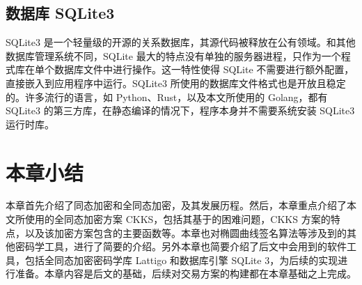 \subsection{数据库 SQLite3}

SQLite3 是一个轻量级的开源的关系数据库，其源代码被释放在公有领域\cite{sqlite3}。和其他数据库管理系统不同，SQLite 最大的特点没有单独的服务器进程，只作为一个程式库在单个数据库文件中进行操作。这一特性使得 SQLite 不需要进行额外配置，直接嵌入到应用程序中运行。SQLite3 所使用的数据库文件格式也是开放且稳定的。许多流行的语言，如 Python、Rust，以及本文所使用的 Golang，都有 SQLite3 的第三方库，在静态编译的情况下，程序本身并不需要系统安装 SQLite3 运行时库。





\section{本章小结}

本章首先介绍了同态加密和全同态加密，及其发展历程。然后，本章重点介绍了本文所使用的全同态加密方案 CKKS，包括其基于的困难问题，CKKS 方案的特点，以及该加密方案包含的主要函数等。本章也对椭圆曲线签名算法等涉及到的其他密码学工具，进行了简要的介绍。另外本章也简要介绍了后文中会用到的软件工具，包括全同态加密密码学库 Lattigo 和数据库引擎 SQLite 3，为后续的实现进行准备。本章内容是后文的基础，后续对交易方案的构建都在本章基础之上完成。
